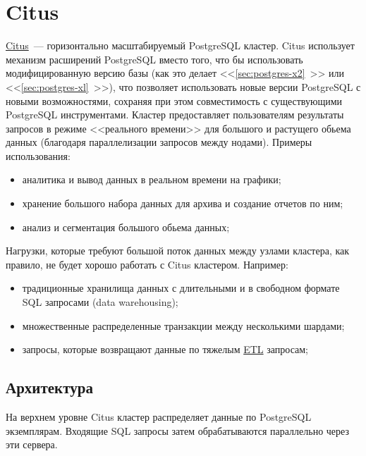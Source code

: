 \section{Citus}
\label{sec:citus}

\href{https://www.citusdata.com/}{Citus}~--- горизонтально масштабируемый PostgreSQL кластер. Citus использует механизм расширений PostgreSQL вместо того, что бы использовать модифицированную версию базы (как это делает <<\ref{sec:postgres-x2}~>> или <<\ref{sec:postgres-xl}~>>), что позволяет использовать новые версии PostgreSQL с новыми возможностями, сохраняя при этом совместимость с существующими PostgreSQL инструментами. Кластер предоставляет пользователям результаты запросов в режиме <<реального времени>> для большого и растущего обьема данных (благодаря параллелизации запросов между нодами). Примеры использования:

\begin{itemize}
  \item аналитика и вывод данных в реальном времени на графики;
  \item хранение большого набора данных для архива и создание отчетов по ним;
  \item анализ и сегментация большого обьема данных;
\end{itemize}

Нагрузки, которые требуют большой поток данных между узлами кластера, как правило, не будет хорошо работать с Citus кластером. Например:

\begin{itemize}
  \item традиционные хранилища данных с длительными и в свободном формате SQL запросами (data warehousing);
  \item множественные распределенные транзакции между несколькими шардами;
  \item запросы, которые возвращают данные по тяжелым \href{https://ru.wikipedia.org/wiki/ETL}{ETL} запросам;
\end{itemize}



\subsection{Архитектура}

На верхнем уровне Citus кластер распределяет данные по PostgreSQL экземплярам. Входящие SQL запросы затем обрабатываются параллельно через эти сервера.

